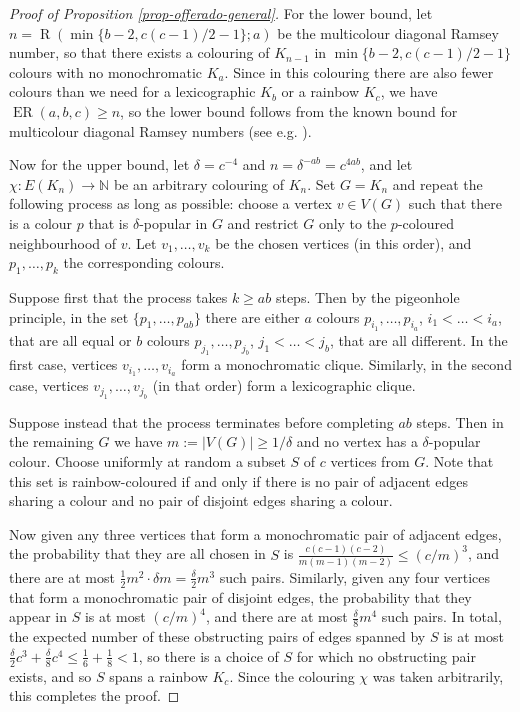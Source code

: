 \documentclass[11pt]{article}
\theoremstyle{plain}
\theoremstyle{definition}
\newcommand{\N}{\mathbb{N}}
\newcommand{\offerado}[3]{\operatorname{ER}(#1,#2,#3)}
\begin{document}
\begin{proof}[Proof of Proposition \ref{prop-offerado-general}]
    For the lower bound, let $n=\operatorname{R}(\min\{b-2,c(c-1)/2-1\};a)$ be the multicolour diagonal Ramsey number, so that there exists a colouring of $K_{n-1}$ in $\min\{b-2,c(c-1)/2-1\}$ colours with no monochromatic $K_a$. Since in this colouring there are also fewer colours than we need for a lexicographic $K_b$ or a rainbow $K_c$, we have $\offerado abc\ge n$, so the lower bound follows from the known bound for multicolour diagonal Ramsey numbers (see e.g. \cite{conlon2021lower}).

    Now for the upper bound, let $\delta=c^{-4}$ and $n=\delta^{-ab}=c^{4ab}$, and let $\chi:E(K_n)\to\N$ be an arbitrary colouring of $K_n$. Set $G=K_n$ and repeat the following process as long as possible: choose a vertex $v\in V(G)$ such that there is a colour $p$ that is $\delta$-popular in $G$ and restrict $G$ only to the $p$-coloured neighbourhood of $v$. Let $v_1,\dots,v_k$ be the chosen vertices (in this order), and $p_1,\dots,p_k$ the corresponding colours. 

    Suppose first that the process takes $k\ge ab$ steps. Then by the pigeonhole principle, in the set $\{p_1,\dots,p_{ab}\}$ there are either $a$ colours $p_{i_1},\dots,p_{i_{a}}$, $i_1<\dots< i_{a}$, that are all equal or $b$ colours $p_{j_1},\dots,p_{j_{b}}$, $j_1<\dots<j_{b}$, that are all different. In the first case, vertices $v_{i_1},\dots,v_{i_a}$ form a monochromatic clique. Similarly, in the second case, vertices $v_{j_1},\dots,v_{j_b}$ (in that order) form a lexicographic clique.

    Suppose instead that the process terminates before completing $ab$ steps. Then in the remaining $G$ we have $m:=|V(G)|\ge 1/\delta$ and no vertex has a $\delta$-popular colour. Choose uniformly at random a subset $S$ of $c$ vertices from $G$. Note that this set is rainbow-coloured if and only if there is no pair of adjacent edges sharing a colour and no pair of disjoint edges sharing a colour.
    
    Now given any three vertices that form a monochromatic pair of adjacent edges, the probability that they are all chosen in $S$ is $\frac{c(c-1)(c-2)}{m(m-1)(m-2)}\le(c/m)^3$, and there are at most $\frac{1}{2}m^2\cdot\delta m=\frac{\delta}{2}m^3$ such pairs. Similarly, given any four vertices that form a monochromatic pair of disjoint edges, the probability that they appear in $S$ is at most $(c/m)^4$, and there are at most $\frac{\delta}{8}m^4$ such pairs. In total, the expected number of these obstructing pairs of edges spanned by $S$ is at most $\frac{\delta}{2}c^3+\frac{\delta}{8}c^4\le \frac{1}{6}+\frac{1}{8}<1$, so there is a choice of $S$ for which no obstructing pair exists, and so $S$ spans a rainbow $K_c$. Since the colouring $\chi$ was taken arbitrarily, this completes the proof.
\end{proof}
\end{document}

